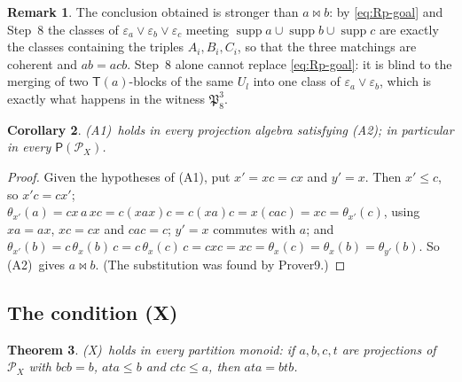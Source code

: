 \documentclass[11pt]{amsart}
\newtheorem{theorem}{Theorem}[section]
\newtheorem{corollary}[theorem]{Corollary}
\theoremstyle{definition}
\newtheorem{remark}[theorem]{Remark}
\renewcommand{\P}{\mathcal{P}}      %
\newcommand{\PA}{\mathsf{P}}         %
\newcommand{\supp}{\operatorname{supp}}
\newcommand{\T}{\mathsf{T}}
\newcommand{\mt}{\bowtie}      %
\newcommand{\Rcond}{\textup{(A1)}}     %
\newcommand{\Rp}{\textup{(A2)}}        %
\newcommand{\Vcond}{\textup{(X)}}      %
\begin{document}
\begin{remark}\label{rem:Rp}
The conclusion obtained is stronger than $a\mt b$: by \eqref{eq:Rp-goal} and Step~8 the classes of $\varepsilon_a\vee\varepsilon_b\vee\varepsilon_c$ meeting $\supp a\cup\supp b\cup\supp c$ are exactly the classes containing the triples $A_i,B_i,C_i$, so that the three matchings are coherent and $ab=acb$. Step~8 alone cannot replace \eqref{eq:Rp-goal}: it is blind to the merging of two $\T(a)$-blocks of the same $U_l$ into one class of $\varepsilon_a\vee\varepsilon_b$, which is exactly what happens in the witness $\mathfrak P_8^3$.
\end{remark}

\begin{corollary}\label{cor:R}
\Rcond\ holds in every projection algebra satisfying \Rp; in particular in every $\PA(\P_X)$.
\end{corollary}

\begin{proof}
Given the hypotheses of \Rcond, put $x'=xc=cx$ and $y'=x$. Then $x'\le c$, so $x'c=cx'$; $\theta_{x'}(a)=cx\,a\,xc=c(xax)c=c(xa)c=x(cac)=xc=\theta_{x'}(c)$, using $xa=ax$, $xc=cx$ and $cac=c$; $y'=x$ commutes with $a$; and $\theta_{x'}(b)=c\,\theta_x(b)\,c=c\,\theta_x(c)\,c=cxc=xc=\theta_x(c)=\theta_x(b)=\theta_{y'}(b)$. So \Rp\ gives $a\mt b$. (The substitution was found by Prover9.)
\end{proof}

\subsection{The condition \Vcond}\label{subsec:V}

\begin{theorem}\label{thm:V}
\Vcond\ holds in every partition monoid: if $a,b,c,t$ are projections of $\P_X$ with $bcb=b$, $ata\le b$ and $ctc\le a$, then $ata=btb$.
\end{theorem}
\end{document}
